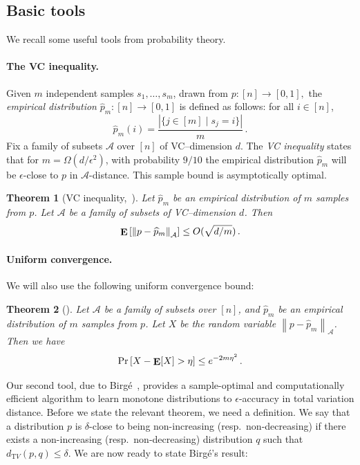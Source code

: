 \documentclass[10pt]{article}
\newtheorem{theorem}{Theorem}[section]
\theoremstyle{definition}
\numberwithin{equation}{section}
\DeclareMathOperator*{\E}{{\bf E}}
\newcommand{\dtv}{d_{\mathrm TV}}
\newcommand{\eps}{\epsilon}
\newcommand{\wh}[1]{{\widehat{#1}}}
\newcommand{\norm}[1]{\left\|#1\right\|}
\begin{document}
\subsection{Basic tools} \label{ssec:tools}

We recall some useful tools from probability theory.

\paragraph{The VC inequality.}
Given $m$ independent samples $s_1,\dots,s_m$, drawn from $p:[n] \to [0,1],$
the \emph{empirical distribution} $\wh{p}_m : [n] \to [0,1]$ is defined as
follows: for all $i \in [n]$,
\[
\wh{p}_m(i) = \frac{|\{j \in [m] \mid s_j=i\}|}{m}\,.
\]
Fix a family of subsets $\mathcal{A}$ over $[n]$ of VC--dimension $d$. 
The \emph{VC inequality} states that for $m=\Omega(d/\eps^2)$,
with probability $9/10$ the {empirical distribution} $\wh{p}_m$ will be
$\eps$-close to $p$ in $\mathcal{A}$-distance.
This sample bound is asymptotically optimal.

\begin{theorem}[VC inequality,~{\cite[p.31]{DL:01}}]
\label{thm:vc-inequality}
Let $\widehat{p}_m$ be an empirical distribution of $m$ samples from $p$.
Let $\mathcal A$ be a family of subsets of VC--dimension $d$.
Then
$$ \E \left [ \norm{p - \widehat{p}_m}_{\mathcal A} \right] \leq O(\sqrt{d/m}) \,.$$
\end{theorem}

\paragraph{Uniform convergence.}
We will also use the following uniform convergence bound:
%
\begin{theorem}[{\cite[p.17]{DL:01}}]
\label{thm:bdd-diff}
Let $\mathcal A$ be a family of subsets over $[n]$, and $\widehat{p}_m$ be an
empirical distribution of $m$ samples from $p$.
Let $X$ be the random variable $\norm{p - \widehat{p}_{m}}_{\mathcal A}$.
Then we have
$$ \Pr\left[ X - \E[X] > \eta \right] \leq e^{-2m\eta^2}\,.$$
\end{theorem}

Our second tool, due to Birg\'{e}~\cite{Birge:87b},
provides a sample-optimal and computationally efficient algorithm
to learn monotone distributions to $\eps$-accuracy in total variation distance.
Before we state the relevant theorem, we need a definition.
We say that a distribution $p$ is $\delta$-close to being non-increasing (resp.\ non-decreasing)
if there exists a non-increasing (resp.\ non-decreasing) distribution $q$ such that
$\dtv(p,q)\leq \delta$. We are now ready to state  Birg\'{e}'s result:
\end{document}
